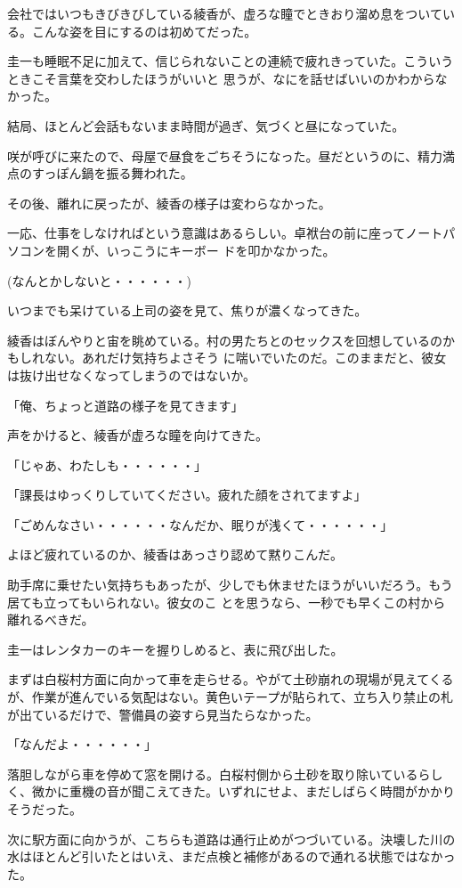 ﻿\documentclass[book,tate]{jlreq}
\begin{document}
会社ではいつもきびきびしている綾香が、虚ろな瞳でときおり溜め息をついている。こんな姿を目にするのは初めてだった。

圭一も睡眠不足に加えて、信じられないことの連続で疲れきっていた。こういうときこそ言葉を交わしたほうがいいと 思うが、なにを話せばいいのかわからなかった。

結局、ほとんど会話もないまま時間が過ぎ、気づくと昼になっていた。

咲が呼びに来たので、母屋で昼食をごちそうになった。昼だというのに、精力満点のすっぽん鍋を振る舞われた。

その後、離れに戻ったが、綾香の様子は変わらなかった。

一応、仕事をしなければという意識はあるらしい。卓袱台の前に座ってノートパソコンを開くが、いっこうにキーボー ドを叩かなかった。

(なんとかしないと・・・・・・)

いつまでも呆けている上司の姿を見て、焦りが濃くなってきた。

綾香はぼんやりと宙を眺めている。村の男たちとのセックスを回想しているのかもしれない。あれだけ気持ちよさそう に喘いでいたのだ。このままだと、彼女は抜け出せなくなってしまうのではないか。

「俺、ちょっと道路の様子を見てきます」

声をかけると、綾香が虚ろな瞳を向けてきた。

「じゃあ、わたしも・・・・・・」

「課長はゆっくりしていてください。疲れた顔をされてますよ」

「ごめんなさい・・・・・・なんだか、眠りが浅くて・・・・・・」

よほど疲れているのか、綾香はあっさり認めて黙りこんだ。

助手席に乗せたい気持ちもあったが、少しでも休ませたほうがいいだろう。もう居ても立ってもいられない。彼女のこ とを思うなら、一秒でも早くこの村から離れるべきだ。

圭一はレンタカーのキーを握りしめると、表に飛び出した。

まずは白桜村方面に向かって車を走らせる。やがて土砂崩れの現場が見えてくるが、作業が進んでいる気配はない。黄色いテープが貼られて、立ち入り禁止の札が出ているだけで、警備員の姿すら見当たらなかった。

「なんだよ・・・・・・」

落胆しながら車を停めて窓を開ける。白桜村側から土砂を取り除いているらしく、微かに重機の音が聞こえてきた。いずれにせよ、まだしばらく時間がかかりそうだった。

次に駅方面に向かうが、こちらも道路は通行止めがつづいている。決壊した川の水はほとんど引いたとはいえ、まだ点検と補修があるので通れる状態ではなかった。
\end{document}
